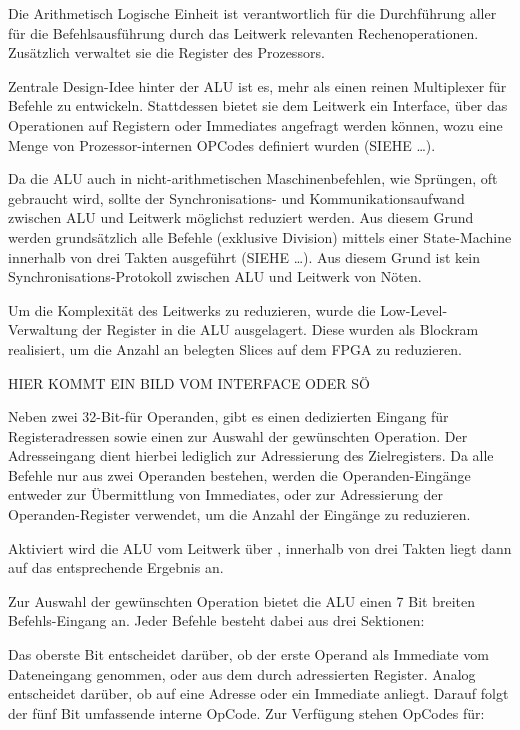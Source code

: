 Die Arithmetisch Logische Einheit ist verantwortlich f\"ur die Durchf\"uhrung aller f\"ur die Befehlsausf\"uhrung durch das Leitwerk relevanten Rechenoperationen. Zusätzlich verwaltet sie die Register des Prozessors.

Zentrale Design-Idee hinter der ALU ist es, mehr als einen reinen Multiplexer f\"ur Befehle zu entwickeln. Stattdessen bietet sie dem Leitwerk ein Interface,
\"uber das Operationen auf Registern oder Immediates angefragt werden k\"onnen, wozu eine Menge von Prozessor-internen OPCodes definiert wurden (SIEHE …).

Da die ALU auch in nicht-arithmetischen Maschinenbefehlen, wie Spr\"ungen, oft gebraucht wird, sollte der Synchronisations- und Kommunikationsaufwand zwischen ALU und Leitwerk m\"oglichst reduziert werden.
Aus diesem Grund werden grundsätzlich alle Befehle (exklusive Division) mittels einer State-Machine innerhalb von drei Takten ausgef\"uhrt (SIEHE …). Aus diesem Grund ist kein Synchronisations-Protokoll zwischen ALU und Leitwerk von N\"oten.

Um die Komplexität des Leitwerks zu reduzieren, wurde die Low-Level-Verwaltung der Register in die ALU ausgelagert. Diese wurden als Blockram realisiert, um die Anzahl an belegten Slices auf dem FPGA zu reduzieren.

HIER KOMMT EIN BILD VOM INTERFACE ODER S\"O

Neben zwei 32-Bit-f\"ur Operanden, gibt es einen dedizierten Eingang f\"ur Registeradressen sowie einen zur Auswahl der gew\"unschten Operation. 
Der Adresseingang dient hierbei lediglich zur Adressierung des Zielregisters. Da alle Befehle nur aus zwei Operanden bestehen, werden die Operanden-Eingänge entweder zur \"Ubermittlung von Immediates, oder zur Adressierung der Operanden-Register verwendet, um die Anzahl der Eingänge zu reduzieren.

Aktiviert wird die ALU vom Leitwerk \"uber , innerhalb von drei Takten liegt dann auf  das entsprechende Ergebnis an.

Zur Auswahl der gew\"unschten Operation bietet die ALU einen 7 Bit breiten Befehls-Eingang an.
Jeder Befehle besteht dabei aus drei Sektionen\vspace{10}:

\vspace{5}

Das oberste Bit  entscheidet dar\"uber, ob der erste Operand als Immediate vom Dateneingang  genommen, oder aus dem durch  adressierten Register.
Analog entscheidet  dar\"uber, ob auf  eine Adresse oder ein Immediate anliegt.
Darauf folgt der f\"unf Bit umfassende interne OpCode. Zur Verf\"ugung stehen OpCodes f\"ur:

